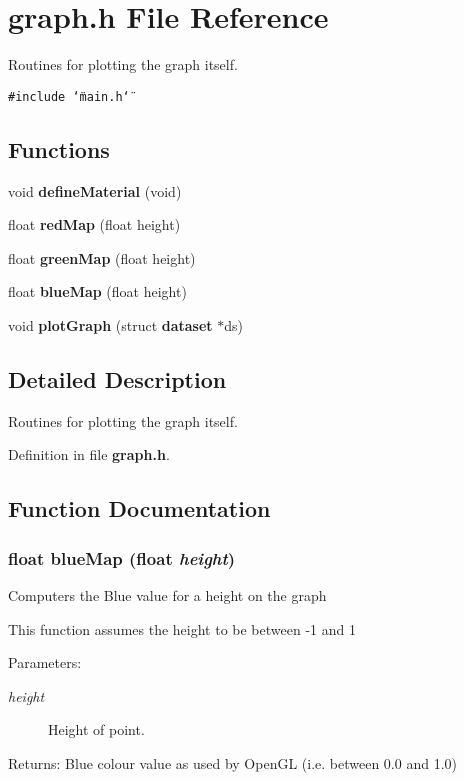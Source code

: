 \section{graph.h File Reference}
\label{graph_8h}
Routines for plotting the graph itself.  


{\tt \#include \char`\"{}main.h\char`\"{}}\par
\subsection*{Functions}
\begin{CompactItemize}
\item 
void {\bf define\-Material} (void)
\item 
float {\bf red\-Map} (float height)
\item 
float {\bf green\-Map} (float height)
\item 
float {\bf blue\-Map} (float height)
\item 
void {\bf plot\-Graph} (struct {\bf dataset} $\ast$ds)
\end{CompactItemize}


\subsection{Detailed Description}
Routines for plotting the graph itself. 



Definition in file {\bf graph.h}.

\subsection{Function Documentation}
\subsubsection{\setlength{\rightskip}{0pt plus 5cm}float blue\-Map (float {\em height})}\label{graph_8h_a3}


Computers the Blue value for a height on the graph

This function assumes the height to be between -1 and 1 \begin{Desc}
\item[Parameters:]
\begin{description}
\item[{\em height}]Height of point. \end{description}
\end{Desc}
\begin{Desc}
\item[Returns:]Blue colour value as used by Open\-GL (i.e. between 0.0 and 1.0) \end{Desc}


